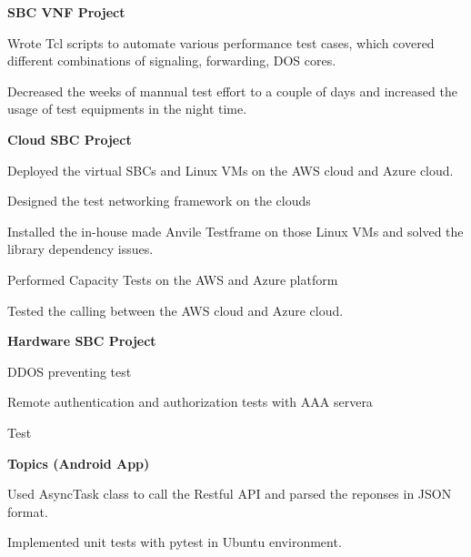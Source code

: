 \documentclass[a4paper]{lyu-resume} %
\begin{document}
\begin{minipage}[t]{0.66\textwidth}
\vspace{\topsep} %
\textbf{SBC VNF Project}
\begin{tightitemize}
\item Wrote Tcl scripts to automate various performance test cases, which covered different combinations of signaling, forwarding, DOS cores.
\item Decreased the weeks of mannual test effort to a couple of days and increased the usage of test equipments in the night time.
\end{tightitemize}
\sectionspace %

\vspace{\topsep} %
\textbf{Cloud SBC Project}
\begin{tightitemize}
\item Deployed the virtual SBCs and Linux VMs on the AWS cloud and Azure cloud. 
\item Designed the test networking framework on the clouds
\item Installed the in-house made Anvile Testframe on those Linux VMs and solved the library dependency issues.
\item Performed Capacity Tests on the AWS and Azure platform 
\item Tested the calling between the AWS cloud and Azure cloud.
\end{tightitemize}
\sectionspace %

\vspace{\topsep} %
\textbf{Hardware SBC Project}
\begin{tightitemize}
\item DDOS preventing test
\item Remote authentication and authorization tests with AAA servera
\item Test
\item 
\item 
\end{tightitemize}
\sectionspace %


\textbf{Topics (Android App)}
\begin{tightitemize}
\item Used AsyncTask class to call the Restful API and parsed the reponses in JSON format.
\item Implemented unit tests with pytest in Ubuntu environment.
\end{tightitemize}


\end{minipage}
\end{document}
